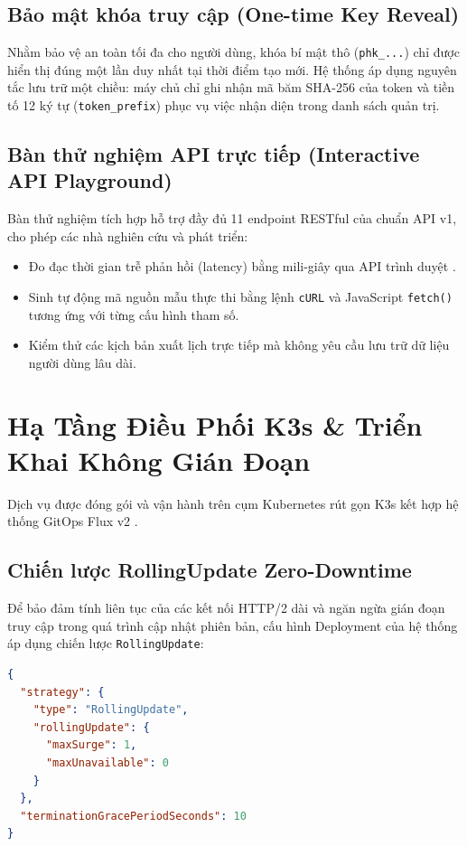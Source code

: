 \documentclass[11pt,a4paper]{article}
\begin{document}
\subsection{Bảo mật khóa truy cập (One-time Key Reveal)}
Nhằm bảo vệ an toàn tối đa cho người dùng, khóa bí mật thô (\texttt{phk\_...}) chỉ được hiển thị đúng một lần duy nhất tại thời điểm tạo mới. Hệ thống áp dụng nguyên tắc lưu trữ một chiều: máy chủ chỉ ghi nhận mã băm SHA-256 của token và tiền tố 12 ký tự (\texttt{token\_prefix}) phục vụ việc nhận diện trong danh sách quản trị.

\subsection{Bàn thử nghiệm API trực tiếp (Interactive API Playground)}
Bàn thử nghiệm tích hợp hỗ trợ đầy đủ 11 endpoint RESTful của chuẩn API v1, cho phép các nhà nghiên cứu và phát triển:
\begin{itemize}
    \item Đo đạc thời gian trễ phản hồi (latency) bằng mili-giây qua API trình duyệt .
    \item Sinh tự động mã nguồn mẫu thực thi bằng lệnh \texttt{cURL} và JavaScript \texttt{fetch()} tương ứng với từng cấu hình tham số.
    \item Kiểm thử các kịch bản xuất lịch trực tiếp mà không yêu cầu lưu trữ dữ liệu người dùng lâu dài.
\end{itemize}

\section{Hạ Tầng Điều Phối K3s \& Triển Khai Không Gián Đoạn}

Dịch vụ được đóng gói và vận hành trên cụm Kubernetes rút gọn K3s \cite{k3s} kết hợp hệ thống GitOps Flux v2 \cite{fluxcd}.

\subsection{Chiến lược RollingUpdate Zero-Downtime}
Để bảo đảm tính liên tục của các kết nối HTTP/2 dài và ngăn ngừa gián đoạn truy cập trong quá trình cập nhật phiên bản, cấu hình Deployment của hệ thống áp dụng chiến lược \texttt{RollingUpdate}:
\begin{lstlisting}[language=json]
{
  "strategy": {
    "type": "RollingUpdate",
    "rollingUpdate": {
      "maxSurge": 1,
      "maxUnavailable": 0
    }
  },
  "terminationGracePeriodSeconds": 10
}
\end{lstlisting}
\end{document}
